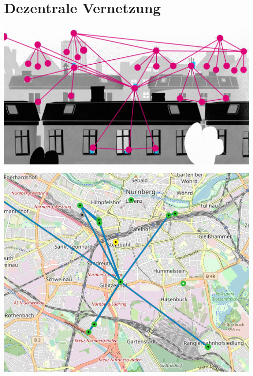 \documentclass{beamer}
\begin{document}
	\section{Dezentrale Vernetzung}
	\begin{frame}
		\includegraphics[width=\framewidth]{media/dachzudach.png}
	\end{frame}
	\begin{frame}
		\includegraphics[width=0.95\framewidth]{media/rf_nbg.png}
	\end{frame}
\end{document}

